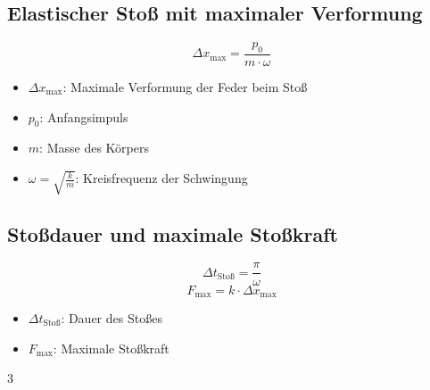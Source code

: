 \documentclass[a4paper, 8pt]{extarticle}
\begin{document}
\begin{landscape}
\begin{multicols*}{3}
\subsection{Elastischer Stoß mit maximaler Verformung}
\[
\Delta x_{\text{max}} = \frac{p_0}{m \cdot \omega}
\]
{\footnotesize
\begin{itemize}
    \item \( \Delta x_{\text{max}} \): Maximale Verformung der Feder beim Stoß
    \item \( p_0 \): Anfangsimpuls
    \item \( m \): Masse des Körpers
    \item \( \omega = \sqrt{\frac{k}{m}} \): Kreisfrequenz der Schwingung
\end{itemize}
}

\subsection{Stoßdauer und maximale Stoßkraft}
\[
\Delta t_{\text{Stoß}} = \frac{\pi}{\omega}
\]
\[
F_{\text{max}} = k \cdot \Delta x_{\text{max}}
\]
{\footnotesize
\begin{itemize}
    \item \( \Delta t_{\text{Stoß}} \): Dauer des Stoßes
    \item \( F_{\text{max}} \): Maximale Stoßkraft
\end{itemize}
}


		\end{multicols*}{3}

\end{landscape}
\end{document}
